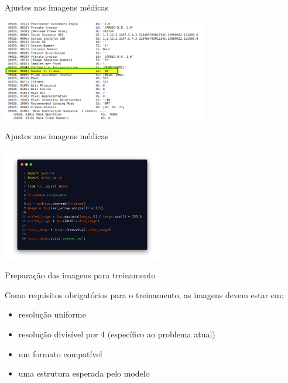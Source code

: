 \documentclass{beamer}
\begin{document}
    \begin{frame}{Ajustes nas imagens médicas}{\thesection \, \secname}

        \centering
        \includegraphics[width=9cm]{img/number_of_frames.png}\\

    \end{frame}

    \begin{frame}{Ajustes nas imagens médicas}{\thesection \, \secname}

        \centering
        \includegraphics[width=7cm]{img/code_2.png} \\

    \end{frame}

    \begin{frame}{Preparação das imagens para treinamento}{\thesection \, \secname}

        Como requisitos obrigatórios para o treinamento, as imagens devem estar em:

        \begin{itemize}
            \item resolução uniforme
            \item resolução divisível por 4 (específico ao problema atual)
            \item um formato compatível
            \item uma estrutura esperada pelo modelo
        \end{itemize}

    \end{frame}
\end{document}
